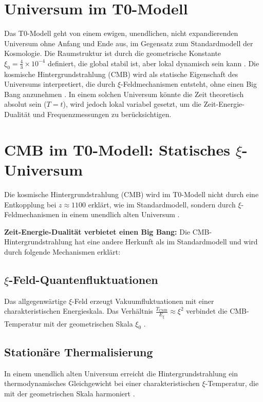 \documentclass[12pt,a4paper]{article}
\begin{document}
	\section{Universum im T0-Modell}
	Das T0-Modell geht von einem ewigen, unendlichen, nicht expandierenden Universum ohne Anfang und Ende aus, im Gegensatz zum Standardmodell der Kosmologie. Die Raumstruktur ist durch die geometrische Konstante \(\xi_0 = \frac{4}{3} \times 10^{-4}\) definiert, die global stabil ist, aber lokal dynamisch sein kann \cite{pascher_t0_energie_2025}. Die kosmische Hintergrundstrahlung (CMB) wird als statische Eigenschaft des Universums interpretiert, die durch \(\xi\)-Feldmechanismen entsteht, ohne einen Big Bang anzunehmen \cite{pascher_t0_cmb_2025}. In einem solchen Universum könnte die Zeit theoretisch absolut sein (\( T = t \)), wird jedoch lokal variabel gesetzt, um die Zeit-Energie-Dualität und Frequenzmessungen zu berücksichtigen.
	
	\section{CMB im T0-Modell: Statisches \(\xi\)-Universum}
	Die kosmische Hintergrundstrahlung (CMB) wird im T0-Modell nicht durch eine Entkopplung bei \( z \approx 1100 \) erklärt, wie im Standardmodell, sondern durch \(\xi\)-Feldmechanismen in einem unendlich alten Universum \cite{pascher_t0_cmb_2025}.
	
	\textbf{Zeit-Energie-Dualität verbietet einen Big Bang:} Die CMB-Hintergrundstrahlung hat eine andere Herkunft als im Standardmodell und wird durch folgende Mechanismen erklärt:
	
	\subsection{\(\xi\)-Feld-Quantenfluktuationen}
	Das allgegenwärtige \(\xi\)-Feld erzeugt Vakuumfluktuationen mit einer charakteristischen Energieskala. Das Verhältnis \( \frac{T_{\text{CMB}}}{E_\xi} \approx \xi^2 \) verbindet die CMB-Temperatur mit der geometrischen Skala \(\xi_0\) \cite{pascher_t0_cmb_2025}.
	
	\subsection{Stationäre Thermalisierung}
	In einem unendlich alten Universum erreicht die Hintergrundstrahlung ein thermodynamisches Gleichgewicht bei einer charakteristischen \(\xi\)-Temperatur, die mit der geometrischen Skala harmoniert \cite{pascher_t0_cmb_2025}.
	
\end{document}
